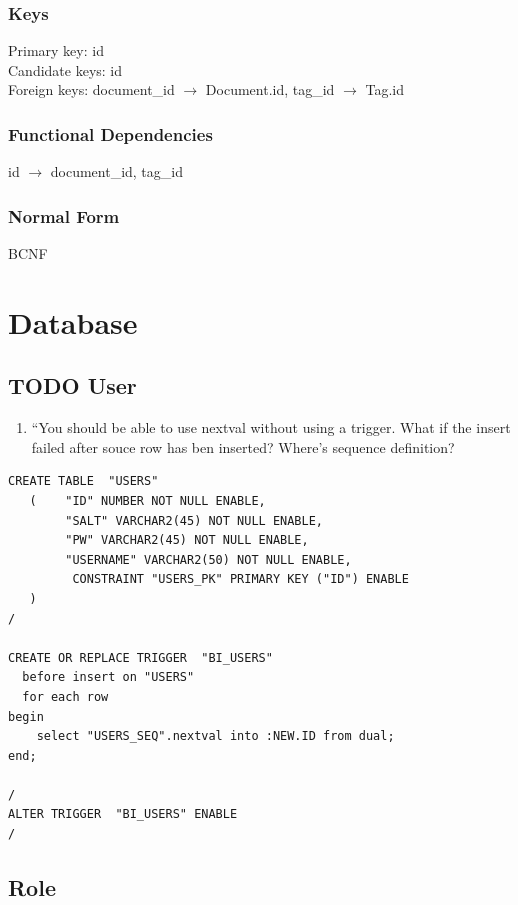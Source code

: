 \documentclass[11pt]{article}
\begin{document}
   
\subsubsection{Keys}
\label{sec-3-11-1}

    
    Primary key: id\\
    Candidate keys: id\\
    Foreign keys: document\_id $\rightarrow$ Document.id, tag\_id $\rightarrow$ Tag.id
\subsubsection{Functional Dependencies}
\label{sec-3-11-2}

    
    id $\rightarrow$ document\_id, tag\_id
\subsubsection{Normal Form}
\label{sec-3-11-3}


    BCNF
    
\section{Database}
\label{sec-4}

  
\subsection{\textbf{TODO} User}
\label{sec-4-1}


\begin{enumerate}
\item ``You should be able to use nextval without using a trigger. What
      if the insert failed after souce row has ben inserted? Where's
      sequence definition?
\end{enumerate}


\begin{verbatim}
CREATE TABLE  "USERS" 
   (    "ID" NUMBER NOT NULL ENABLE, 
        "SALT" VARCHAR2(45) NOT NULL ENABLE, 
        "PW" VARCHAR2(45) NOT NULL ENABLE, 
        "USERNAME" VARCHAR2(50) NOT NULL ENABLE, 
         CONSTRAINT "USERS_PK" PRIMARY KEY ("ID") ENABLE
   )
/

CREATE OR REPLACE TRIGGER  "BI_USERS" 
  before insert on "USERS"               
  for each row  
begin   
    select "USERS_SEQ".nextval into :NEW.ID from dual; 
end; 

/
ALTER TRIGGER  "BI_USERS" ENABLE
/
\end{verbatim}
\subsection{Role}
\label{sec-4-2}
\end{document}
